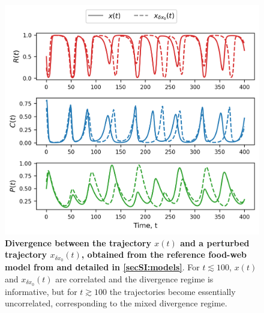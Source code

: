 \begin{figure}[ht]
    \centering
    \includegraphics[]{figures/SI/perturbed_ICs.png}
    \caption{\textbf{Divergence between the trajectory $x(t)$ and a perturbed trajectory $x_{\delta x_0}(t)$, obtained from the reference food-web model from \cite{Hastings1991} and detailed in \cref{secSI:models}}. For $t \lesssim 100$, $x(t)$ and $x_{\delta x_0}(t)$ are correlated and the divergence regime is informative, but for $t \gtrsim 100$ the trajectories become essentially uncorrelated, corresponding to the mixed divergence regime.}
    \label{figSI:perturbed_ICs}
\end{figure}

\FloatBarrier


